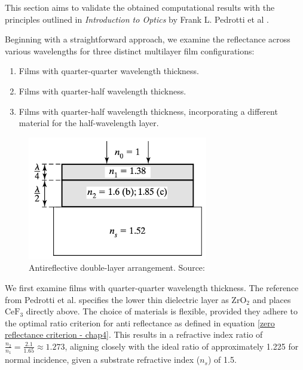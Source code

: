 This section aims to validate the obtained computational results with the principles outlined in \emph{Introduction to Optics} by Frank L. Pedrotti et al \cite{pedrotti_introduction_2007}.

Beginning with a straightforward approach, we examine the reflectance across various wavelengths for three distinct multilayer film configurations:
\begin{enumerate}
    \item Films with quarter-quarter wavelength thickness.
    \item Films with quarter-half wavelength thickness.
    \item Films with quarter-half wavelength thickness, incorporating a different material for the half-wavelength layer.
\end{enumerate}

\begin{figure}[H]
  \centering
  \includegraphics[width=0.7\textwidth]{Chapters/Figures/Chapter 4 Figures/Antireflecting Double Layer using Quarter and Half-Wavelength Thickness Films Layout.png}
  \caption{Antireflective double-layer arrangement. Source: \cite{pedrotti_introduction_2007}}
  \label{fig:antireflective_double_layer}
\end{figure}

We first examine films with quarter-quarter wavelength thickness. The reference from Pedrotti et al. specifies the lower thin dielectric layer as $\text{ZrO}_2$ and places $\text{CeF}_3$ directly above. The choice of materials is flexible, provided they adhere to the optimal ratio criterion for anti reflectance as defined in equation \ref{zero reflectance criterion - chap4}. This results in a refractive index ratio of $\frac{n_2}{n_1} = \frac{2.1}{1.65} \approx 1.273$, aligning closely with the ideal ratio of approximately 1.225 for normal incidence, given a substrate refractive index ($n_s$) of 1.5.

